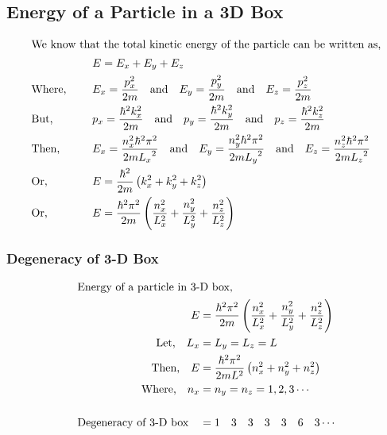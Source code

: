   \subsection{Energy of a Particle in a 3D Box}
  \begin{alignat*}{2}
  \intertext{We know that the total kinetic  energy of the particle can be written as,}
  &\left. \right. &&E=E_{x}+E_{y}+E_{z}\\
  &\text{Where, } \quad && E_{x}= \frac{p_{x}^{2}}{2m} \quad \text{and} \quad E_{y}= \frac{p_{y}^{2}}{2m}\quad \text{and} \quad E_{z}= \frac{p_{z}^{2}}{2m}\\
  &\text{But,} \quad  &&p_{x}= \frac{\hbar^{2} k_{x}^{2}}{2m} \quad \text{and}\quad  p_{y}= \frac{\hbar^{2} k_{y}^{2}}{2m}\quad \text{and}\quad  p_{z}= \frac{\hbar^{2} k_{z}^{2}}{2m}\\
  &\text{Then,} \quad  &&E_{x}=\frac{{ n_{x}^{2}\hbar^{2}} {\pi}^{2}}{2m {L_{x}}^{2}} \quad \text{and}\quad E_{y}=\frac{{ n_{y}^{2}\hbar^{2}} {\pi}^{2}}{2m {L_{y}}^{2}} \quad \text{and}\quad E_{z}=\frac{{ n_{z}^{2}\hbar^{2}} {\pi}^{2}}{2m {L_{z}}^{2}}\\
  &\text{Or,} \quad &&E=  \frac{\hbar^{2}}{2m}\left(  k_{x}^{2}+k_{y}^{2}+k_{z}^{2}\right) \\
  &\text{Or,}\quad &&E= \frac{\hbar^{2} \pi^{2}}{2m}\left(  \frac{n_{x}^{2}}{L_{x}^{2}}+ \frac{n_{y}^{2}}{L_{y}^{2}}+\frac{n_{z}^{2}}{L_{z}^{2}}\right)
  \end{alignat*}
  \begin{center}
  \end{center}
  \subsubsection{Degeneracy of 3-D Box}
  \begin{align*}
  \intertext{Energy of a particle in 3-D box,}
  E&= \frac{\hbar^{2} \pi^{2}}{2m}\left(  \frac{n_{x}^{2}}{L_{x}^{2}}+ \frac{n_{y}^{2}}{L_{y}^{2}}+\frac{n_{z}^{2}}{L_{z}^{2}}\right)\\
  \text{Let,}\quad L_{x}&=L_{y}=L_{z}=L\\
  \text{Then,}\quad E&= \frac{\hbar^{2} \pi^{2}}{2mL^{2}}\left({n_{x}^{2}}+ {n_{y}^{2}}+{n_{z}^{2}}\right)\\
  \text{Where,}\quad n_{x}&=n_{y}=n_{z}=1,2,3\cdots\\\\
  \text{Degeneracy of 3-D box}\quad &= 1\quad 3 \quad 3 \quad 3 \quad 3 \quad 6 \quad 3  \cdots
  \end{align*}
  
